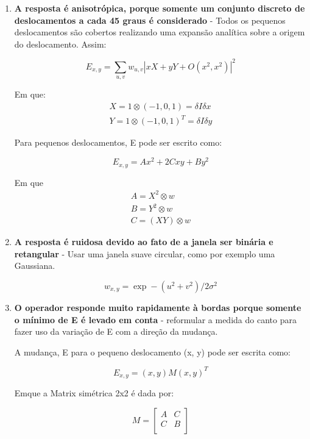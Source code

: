 \documentclass[10pt,a4paper]{article}
\begin{document}
\begin{enumerate}
\item \textbf{A resposta é anisotrópica, porque somente um
conjunto discreto de deslocamentos a cada 45 graus é
considerado} - Todos os pequenos deslocamentos são cobertos
realizando uma expansão analítica sobre a origem do deslocamento.
Assim:

\begin{equation}
E_{x,y}=\sum_{u,v}w_{u,v}\left | xX +yY + O(x^2,x^2) \right  |^2 
\end{equation}

Em que:
\begin{eqnarray*}
X = 1 \otimes (-1,0,1)= \delta I \delta x\\
Y = 1 \otimes (-1,0,1)^T= \delta I \delta y
\end{eqnarray*}

Para pequenos deslocamentos, E pode ser escrito como:

\begin{equation}
E_{x,y}=Ax^2+ 2Cxy + By^2 
\end{equation}

Em que 
\begin{eqnarray*}
A= X^2\otimes w\\
B= Y^2\otimes w\\
C= (XY)\otimes w
\end{eqnarray*}

\item \textbf{A resposta é ruidosa devido ao fato de a  janela ser
    binária e retangular} - Usar uma janela suave circular, como por
  exemplo uma Gaussiana.

\begin{equation}
w_{x,y}=\exp-(u^2+ v^2)/2\sigma^2 
\end{equation}

\item \textbf{O operador responde muito rapidamente à bordas 
porque somente o mínimo de E é levado em
conta} - reformular a medida do canto para fazer uso da variação de E com a direção da mudança.

A mudança, E para o pequeno deslocamento (x, y) pode ser escrita como:

\begin{equation}
E_{x,y}=(x,y)M(x,y)^T
\end{equation}

Emque a Matrix simétrica 2x2 é dada por:


\[
 M = \begin{bmatrix}
       A & C \\[0.3em]
       C & B \\[0.3em]
     \end{bmatrix}
\]


\end{enumerate}
\end{document}
